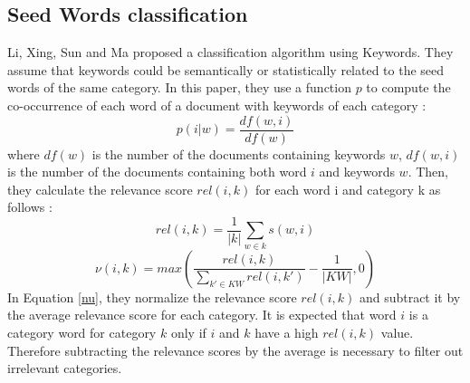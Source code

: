 \subsection{\label{seq:BackLexicalConstraint}Seed Words classification}
Li, Xing, Sun and Ma \cite{Li:2016:EDL:2983323.2983721} proposed a
classification algorithm using Keywords. They assume that keywords could be 
semantically or statistically related to the seed words of the same category.
In this paper, they
use a function $p$ to compute the co-occurrence of each word of a document
with keywords of each category : 
\begin{equation}\label{sim}
p(i|w) = \frac{df(w,i)}{df(w)}
\end{equation}
where $df(w)$ is the number of the documents containing keywords $w$,
$df(w, i)$ is the number of the documents containing both word
$i$ and keywords $w$.
Then, they calculate the relevance score $rel(i, k)$ for each 
word i and category k as follows :
\begin{equation}\label{rel}
  rel(i,k) = \frac{1}{|k|} \sum\limits_{w \in k} s(w,i)
\end{equation}
\begin{equation}\label{nu}
  \nu(i,k) = max \left(\frac{rel(i,k)}{\sum\limits_{k' \in KW}rel(i,k')} - \frac{1}{|KW|}, 0\right)
\end{equation}
In Equation \ref{nu}, they normalize the relevance score $rel(i,k)$ and 
subtract it by the average relevance score for each category. It is
expected that word $i$ is a category word for category $k$ only if $i$ and
$k$ have a high $rel(i,k)$ value. Therefore subtracting the relevance
scores by the average is necessary to filter out irrelevant categories.
